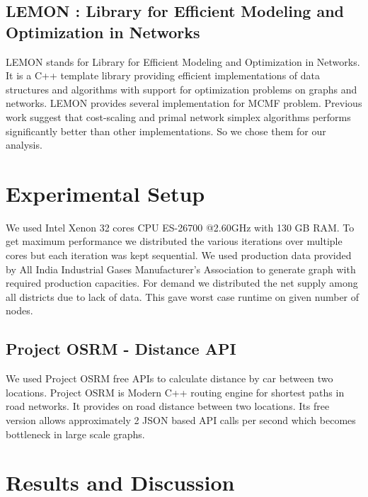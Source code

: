 \documentclass{article}
\begin{document}
\subsection{LEMON : Library for Efficient Modeling and Optimization in Networks}
LEMON stands for Library for Efficient Modeling and Optimization in Networks. It is a C++ template library providing efficient implementations of data structures and algorithms with support for optimization problems on graphs and networks. LEMON provides several implementation for MCMF problem. Previous work suggest that cost-scaling and primal network simplex algorithms performs significantly better than other implementations\citep{doi:10.1080/10556788.2014.895828}. So we chose them for our analysis.

\section{Experimental Setup}
We used Intel Xenon 32 cores CPU ES-26700 @2.60GHz with 130 GB RAM. To get maximum performance we distributed the various iterations over multiple cores but each iteration was kept sequential. We used production data provided by All India Industrial Gases Manufacturer’s Association to generate graph with required production capacities. For demand we distributed the net supply among all districts due to lack of data. This gave worst case runtime on given number of nodes.

\subsection{Project OSRM - Distance API}
We used Project OSRM free APIs to calculate distance by car between two locations.
Project OSRM is  Modern C++ routing engine for shortest paths in road networks. It provides on road distance between two locations. Its free version allows approximately 2 JSON based API calls per second which becomes bottleneck in large scale graphs.  

\section{Results and Discussion}
\end{document}
